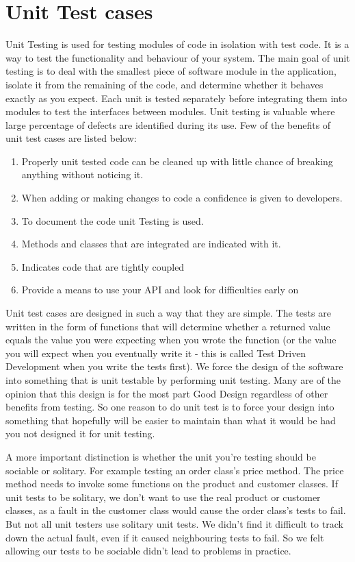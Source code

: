 \documentclass[article,type=msc,colorback,accentcolor=tud9c,twoside,11pt]{tudthesis}
\begin{document}
\section{Unit Test cases}
Unit Testing\cite{EffectivnessofUnitTest} is used for testing modules of code in isolation with test code. It is a way to test the functionality and behaviour of your system. The main goal of unit testing is to deal with the smallest piece of software module in the application, isolate it from the remaining of the code, and determine whether it behaves exactly as you expect. Each unit is tested separately before integrating them into modules to test the interfaces between modules. Unit testing is valuable where large percentage of defects are identified during its use. Few of the benefits of unit test cases are listed below:
\begin{enumerate}
\item Properly unit tested code can be cleaned up with little chance of breaking anything without noticing it.
\item When adding or making changes to code a confidence is given to developers.
\item To document the code unit Testing is used.
\item Methods and classes that are integrated are indicated with it. 
\item Indicates code that are tightly coupled
\item Provide a means to use your API and look for difficulties early on 
\end{enumerate}
Unit test cases are designed in such a way that they are simple\cite{JMLandJUnit}. The tests are written in the form of functions that will determine whether a returned value equals the value you were expecting when you wrote the function (or the value you will expect when you eventually write it - this is called Test Driven Development when you write the tests first). We force the design of the software into something that is unit testable by performing unit testing. Many are of the opinion that this design is for the most part Good Design regardless of other benefits from testing. So one reason to do unit test is to force your design into something that hopefully will be easier to maintain than what it would be had you not designed it for unit testing.

A more important distinction is whether the unit you're testing should be sociable or solitary. For example testing an order class's price method. The price method needs to invoke some functions on the product and customer classes. If unit tests to be solitary, we don't want to use the real product or customer classes, as a fault in the customer class would cause the order class's tests to fail. But not all unit testers use solitary unit tests. We didn't find it difficult to track down the actual fault, even if it caused neighbouring tests to fail. So we felt allowing our tests to be sociable didn't lead to problems in practice.
\end{document}
